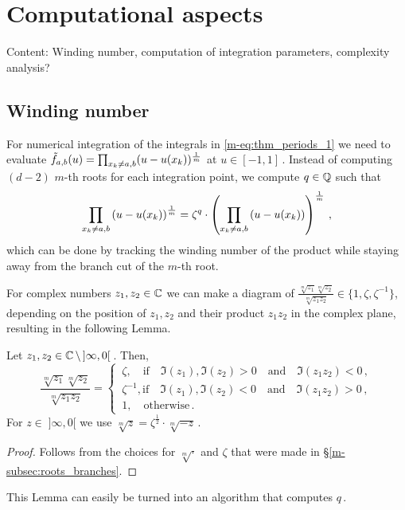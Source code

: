 \documentclass[main.tex]{subfiles}
\begin{document}
  \section{Computational aspects}

  Content: Winding number, computation of integration parameters, complexity analysis?

  \subsection{Winding number}
      
      For numerical integration of the integrals in \eqref{m-eq:thm_periods_1} we need to evaluate $\tilde{f}_{a,b}(u) = \prod_{x_k \ne a,b} (u-u(x_k))^{\frac{1}{m}}$ at $u \in [-1,1]$\,. 
      Instead of computing $(d-2)$ $m$-th roots for each integration point, we compute $q \in \mathbb{Q}$ such that
      $$\prod_{x_k \ne a,b} \left(u - u(x_k) \right)^{\frac{1}{m}} = \zeta^q \cdot \left( \prod_{x_k \ne a,b} \left( u - u(x_k) \right) \right)^{\frac{1}{m}} \,,$$
      which can be done by tracking the winding number of the product while staying away from the branch cut of the $m$-th root.
      
      For complex numbers $z_1,z_2 \in \mathbb{C}$ we can make a diagram of $\frac{\sqrt[m]{z_1}\sqrt[m]{z_2}}{\sqrt[m]{z_1z_2}} \in \{ 1, \zeta, \zeta^{-1} \}$, depending on the position of
      $z_1,z_2$ and their product $z_1z_2$ in the complex plane, resulting in the following Lemma.
      
     \begin{lemma}\label{lemma:wind_numb}
     Let $z_1,z_2 \in \mathbb{C} \, \setminus \, ]\infty,0[$\,. Then,
     $$\frac{\sqrt[m]{z_1}\sqrt[m]{z_2}}{\sqrt[m]{z_1z_2}} = \begin{cases}
                                                             \, \zeta, \quad \text{if} \quad \Im(z_1), \Im(z_2) > 0 \quad \text{and} \quad \Im(z_1z_2) < 0 \,, \\
                                                             \, \zeta^{-1}, \text{if} \quad \Im(z_1), \Im(z_2) < 0 \quad \text{and} \quad \Im(z_1z_2) > 0 \,, \\
                                                             \, 1, \quad \text{otherwise}\,.
                                                            \end{cases}$$
      For $z \in \;]\infty,0[$ we use $\sqrt[m]{z} = \zeta^{\frac{1}{2}} \cdot \sqrt[m]{-z}$\,.
     \end{lemma}
     \begin{proof}
      Follows from the choices for $\sqrt[m]{\cdot}$ and $\zeta$ that were made in \S \ref{m-subsec:roots_branches}.
     \end{proof}
      This Lemma can easily be turned into an algorithm that computes $q$\,.
 
 \biblio
\end{document}
